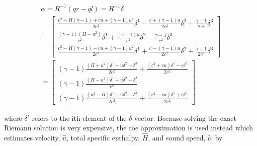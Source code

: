 \documentclass[11pt]{article}%
\numberwithin{equation}{section}
\begin{document}
\begin{equation}
\begin{split}
\alpha = R^{-1}(qr - ql)  = R^{-1} \delta \\
= \left[ \begin{array}{c} \frac{c^2 + H (\gamma-1) + c u + (\gamma-1) u^2}{2 c^2} \delta^1 -\frac{c + (\gamma - 1) u}{2 c^2} \delta^2 +   \frac{\gamma - 1}{2 c^2} \delta^3 \\ \frac{ (\gamma - 1) (H - u^2)}{c^2} \delta^1 +  \frac{(\gamma - 1) u}{c^2} \delta^2 -  \frac{\gamma - 1}{ c^2}  \delta^3 \\ \frac{c^2 - H (\gamma - 1) - c u + (\gamma - 1) u^2}{2 c^2} \delta^1 + \frac{c - (\gamma - 1) u}{2 c^2} \delta^2 +   \frac{\gamma - 1}{2 c^2} \delta^3 \end{array} \right] \\
= \left[ \begin{array}{c} (\gamma - 1) \frac{(H + u^2) \delta^1 - u \delta^2 + \delta^3}{2 c^2} + \frac{(c^2 + c u) \delta^1 - c \delta^2}{2 c^2} \\ (\gamma - 1) \frac{(H - u^2)\delta^1 + u \delta^2 - \delta^3}{ c^2} \\ (\gamma - 1) \frac{(u^2 - H) \delta^1 - u \delta^2 + \delta^3}{2 c^2} + \frac{(c^2 - c u) \delta^1 + c \delta^2}{2 c^2} \end{array} \right]
\end{split} \label{coeffcients}
\end{equation}

where $\delta^i$ refers to the ith element of the $\delta$ vector. Because solving the exact Riemann solution is very expensive, the roe approximation is used instead which estimates velocity, $\hat{u}$, total specific enthalpy, $\hat{H}$, and sound speed, $\hat{c}$, by
\end{document}
